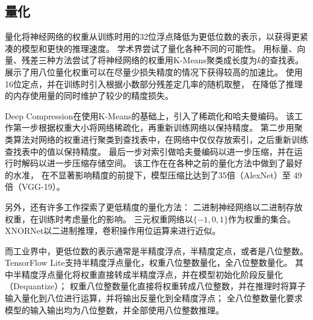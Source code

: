 \subsection{量化}
量化将神经网络的权重从训练时用的32位浮点降低为更低位数的表示，以获得更紧凑的模型和更快的推理速度。
学术界尝试了量化各种不同的可能性。
\parencite{gong2014compressing}用标量、向量、残差三种方法尝试了将神经网络的权重用K-Means聚类成长度为$k$的查找表。
\parencite{vanhoucke2011improving}展示了用八位量化权重可以在尽量少损失精度的情况下获得较高的加速比。
\parencite{gupta2015deep}使用16位定点，并在训练时引入根据小数部分残差定几率的随机取整，
在降低了推理的内存使用量的同时维护了较少的精度损失。

Deep Compression\cite{han2015deep}在\parencite{gong2014compressing}使用K-Means的基础上，引入了稀疏化和哈夫曼编码。
该工作第一步根据权重大小将网络稀疏化，再重新训练网络以保持精度。
第二步用聚类算法对网络的权重进行聚类到查找表中，在网络中仅仅存放索引，之后重新训练查找表中的值以保持精度。
最后一步对索引做哈夫曼编码以进一步压缩，并在运行时解码以进一步压缩存储空间。
该工作在在各种之前的量化方法中做到了最好的水准，
在不显著影响精度的前提下，模型压缩比达到了35倍（AlexNet）至 49倍（VGG-19）。

另外，还有许多工作探索了更低精度的量化方法：
二进制神经网络\cite{courbariaux2016binarized}以二进制存放权重，在训练时考虑量化的影响。
三元权重网络\cite{li2016ternary}以$\{-1,0,1\}$作为权重的集合。
XNORNet\cite{rastegari2016xnor}以二进制推理，卷积操作用位运算来进行近似。

而工业界中，更低位数的表示通常是半精度浮点，半精度定点，或者是八位整数。
TensorFlow Lite支持半精度浮点量化，权重八位整数量化，全八位整数量化。
其中半精度浮点量化将权重直接转成半精度浮点，并在模型初始化阶段反量化（Dequantize）；
权重八位整数量化直接将权重转成八位整数，并在推理时将算子输入量化到八位进行运算，并将输出反量化到全精度浮点；
全八位整数量化要求模型的输入输出均为八位整数，并全部使用八位整数推理。
